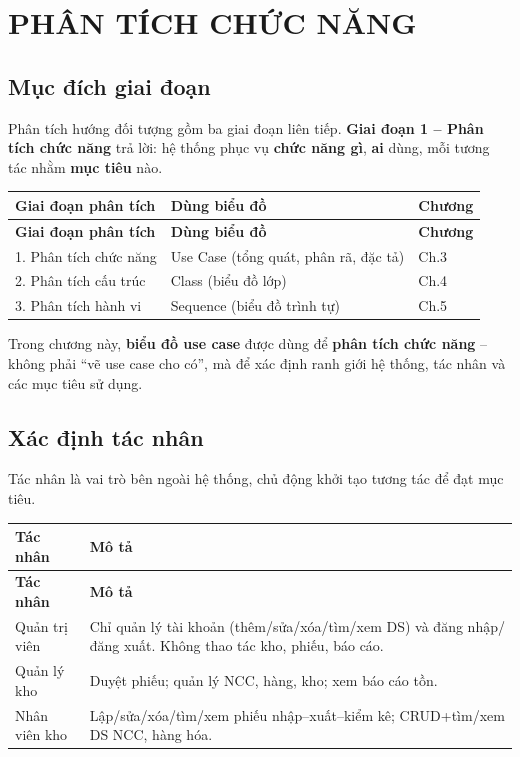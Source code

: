 \chapter{PHÂN TÍCH CHỨC NĂNG}

\section{Mục đích giai đoạn}

Phân tích hướng đối tượng gồm ba giai đoạn liên tiếp. \textbf{Giai đoạn 1 -- Phân tích chức năng} trả lời: hệ thống phục vụ \textbf{chức năng gì}, \textbf{ai} dùng, mỗi tương tác nhằm \textbf{mục tiêu} nào.

\begin{longtable}{|p{4cm}|p{5cm}|p{4cm}|}
\hline
\textbf{Giai đoạn phân tích} & \textbf{Dùng biểu đồ} & \textbf{Chương} \\
\hline
\endfirsthead
\hline
\textbf{Giai đoạn phân tích} & \textbf{Dùng biểu đồ} & \textbf{Chương} \\
\hline
\endhead
1. Phân tích chức năng & Use Case (tổng quát, phân rã, đặc tả) & Ch.3 \\
\hline
2. Phân tích cấu trúc & Class (biểu đồ lớp) & Ch.4 \\
\hline
3. Phân tích hành vi & Sequence (biểu đồ trình tự) & Ch.5 \\
\hline
\end{longtable}

Trong chương này, \textbf{biểu đồ use case} được dùng để \textbf{phân tích chức năng} -- không phải ``vẽ use case cho có'', mà để xác định ranh giới hệ thống, tác nhân và các mục tiêu sử dụng.

\section{Xác định tác nhân}

Tác nhân là vai trò bên ngoài hệ thống, chủ động khởi tạo tương tác để đạt mục tiêu.

\begin{longtable}{|p{3.2cm}|p{9.5cm}|}
\hline
\textbf{Tác nhân} & \textbf{Mô tả} \\
\hline
\endfirsthead
\hline
\textbf{Tác nhân} & \textbf{Mô tả} \\
\hline
\endhead
Quản trị viên & Chỉ quản lý tài khoản (thêm/sửa/xóa/tìm/xem DS) và đăng nhập/đăng xuất. Không thao tác kho, phiếu, báo cáo. \\
\hline
Quản lý kho & Duyệt phiếu; quản lý NCC, hàng, kho; xem báo cáo tồn. \\
\hline
Nhân viên kho & Lập/sửa/xóa/tìm/xem phiếu nhập--xuất--kiểm kê; CRUD+tìm/xem DS NCC, hàng hóa. \\
\hline
\end{longtable}

